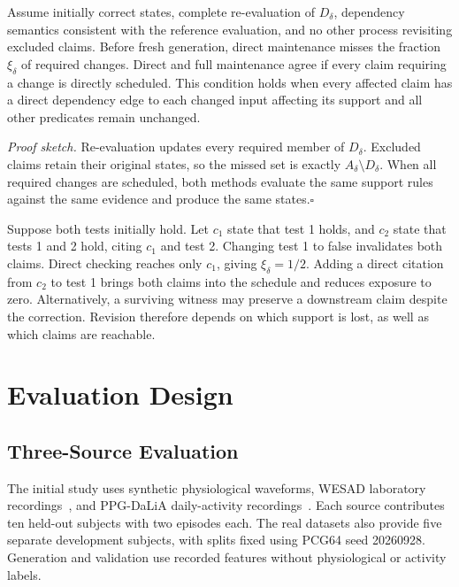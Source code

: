 \documentclass[runningheads]{llncs}
\begin{document}
\begin{proposition}
Assume initially correct states, complete re-evaluation of $D_\delta$,
dependency semantics consistent with the reference evaluation, and no other
process revisiting excluded claims. Before fresh generation, direct maintenance
misses the fraction $\xi_\delta$ of required changes. Direct and full maintenance
agree if every claim requiring a change is directly scheduled. This condition
holds when every affected claim has a direct dependency edge to each changed
input affecting its support and all other predicates remain unchanged.
\end{proposition}
\noindent\emph{Proof sketch.}
Re-evaluation updates every required member of $D_\delta$. Excluded claims
retain their original states, so the missed set is exactly
$A_\delta\setminus D_\delta$. When all required changes are scheduled, both
methods evaluate the same support rules against the same evidence and
produce the same states.\hfill$\square$

Suppose both tests initially hold. Let $c_1$ state that test 1 holds, and
$c_2$ state that tests 1 and 2 hold, citing $c_1$ and test 2.
Changing test 1 to false invalidates both claims. Direct checking reaches
only $c_1$, giving $\xi_\delta=1/2$. Adding a direct citation from $c_2$ to
test 1 brings both claims into the schedule and reduces exposure to zero.
Alternatively, a surviving witness may preserve a downstream claim despite
the correction. Revision therefore depends on which support is lost,
as well as which claims are reachable.



\section{Evaluation Design}
\label{sec:design}

\subsection{Three-Source Evaluation}

The initial study uses synthetic physiological waveforms, WESAD laboratory
recordings~\cite{schmidt2018,wesad}, and PPG-DaLiA daily-activity
recordings~\cite{reiss2019,ppgdalia}. Each source contributes ten held-out
subjects with two episodes each. The real datasets also provide five separate
development subjects, with splits fixed using PCG64 seed 20260928.
Generation and validation use recorded features without physiological or
activity labels.
\end{document}
